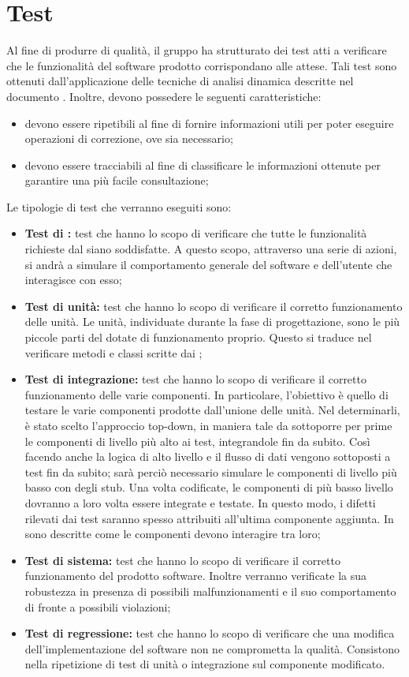 \documentclass[PianoDiQualifica.tex]{subfiles}
\begin{document}
\section{Test}
Al fine di produrre  di qualità, il gruppo ha strutturato dei test atti a verificare che le funzionalità del software prodotto corrispondano alle attese.
Tali test sono ottenuti dall'applicazione delle tecniche di analisi dinamica descritte nel documento \NPdocRP{}. Inoltre, devono possedere le seguenti caratteristiche:
\begin{itemize}
	\item devono essere ripetibili al fine di fornire informazioni utili per poter eseguire operazioni di correzione, ove sia necessario;
	\item devono essere tracciabili al fine di classificare le informazioni ottenute per garantire una più facile consultazione;
\end{itemize}
Le tipologie di test che verranno eseguiti sono:
\begin{itemize}
\item \textbf{Test di :} test che hanno lo scopo di verificare che tutte le funzionalità richieste dal  siano soddisfatte. A questo scopo, attraverso una serie di
azioni, si andrà a simulare il comportamento generale del software e dell'utente che interagisce con esso;
\item \textbf{Test di unità: } test che  hanno lo scopo di verificare il corretto funzionamento delle unità. Le unità, individuate durante la fase di progettazione, sono le
		più piccole parti del  dotate di funzionamento proprio. Questo si traduce nel verificare metodi e classi scritte dai \PRP{};
\item \textbf{Test di integrazione: } test che hanno lo scopo di verificare il corretto funzionamento delle varie componenti. In particolare, l'obiettivo è quello di testare le varie componenti prodotte dall'unione delle unità. Nel determinarli, è stato scelto l'approccio top-down, in maniera tale da sottoporre per prime le componenti di livello più alto ai test, integrandole fin da subito. Così facendo anche la logica di alto livello e il flusso di dati vengono sottoposti a test fin da subito; sarà perciò necessario simulare le componenti di livello più basso con degli stub. Una volta codificate, le componenti di più basso livello dovranno a loro volta essere
integrate e testate. In questo modo, i difetti rilevati dai test saranno spesso attribuiti all'ultima componente aggiunta. In \DPdoc{} sono descritte come le componenti devono interagire tra loro;
\item \textbf{Test di sistema: }test che hanno lo scopo di verificare il corretto funzionamento del prodotto software. Inoltre verranno verificate la sua robustezza in presenza di
		possibili malfunzionamenti e il suo comportamento di fronte a possibili violazioni;
\item \textbf{Test di regressione: } test che hanno lo scopo di verificare che una modifica dell'implementazione del software non ne comprometta la qualità. Consistono nella ripetizione di test di unità o integrazione sul componente modificato.			
\end{itemize}
\end{document}
